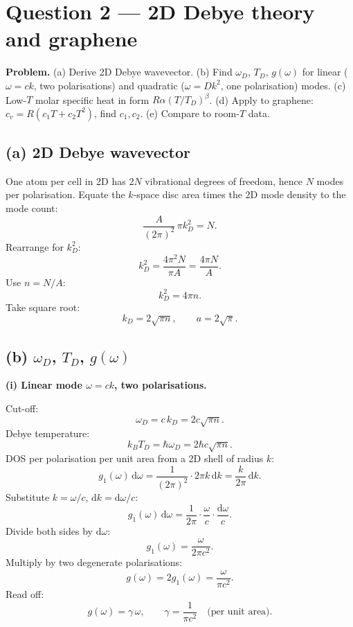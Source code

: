 \documentclass[11pt]{article}
\newcommand{\de}{\mathrm{d}}
\begin{document}
\section*{Question 2 --- 2D Debye theory and graphene}

\textbf{Problem.} (a) Derive 2D Debye wavevector. (b) Find $\omega_D$, $T_D$, $g(\omega)$ for linear ($\omega=ck$, two polarisations) and quadratic ($\omega=Dk^2$, one polarisation) modes. (c) Low-$T$ molar specific heat in form $R\alpha(T/T_D)^\beta$. (d) Apply to graphene: $c_v = R(c_1 T + c_2 T^2)$, find $c_1, c_2$. (e) Compare to room-$T$ data.

\subsection*{(a) 2D Debye wavevector}

One atom per cell in 2D has $2N$ vibrational degrees of freedom, hence $N$ modes per polarisation. Equate the $k$-space disc area times the 2D mode density to the mode count:
\[
\frac{A}{(2\pi)^2}\,\pi k_D^2 = N.
\]
Rearrange for $k_D^2$:
\[
k_D^2 = \frac{4\pi^2 N}{\pi A} = \frac{4\pi N}{A}.
\]
Use $n = N/A$:
\[
k_D^2 = 4\pi n.
\]
Take square root:
\begin{equation}
\boxed{\;k_D = 2\sqrt{\pi n},\qquad a = 2\sqrt{\pi}.\;}
\label{eq:kD2D}
\end{equation}

\subsection*{(b) $\omega_D$, $T_D$, $g(\omega)$}

\textbf{(i) Linear mode $\omega=ck$, two polarisations.}

Cut-off:
\[
\omega_D = c\,k_D = 2c\sqrt{\pi n}.
\]
Debye temperature:
\[
\boxed{\;k_B T_D = \hbar\omega_D = 2\hbar c\sqrt{\pi n}.\;}
\]
DOS per polarisation per unit area from a 2D shell of radius $k$:
\[
g_1(\omega)\,\de\omega = \frac{1}{(2\pi)^2}\cdot 2\pi k\,\de k = \frac{k}{2\pi}\,\de k.
\]
Substitute $k = \omega/c$, $\de k = \de\omega/c$:
\[
g_1(\omega)\,\de\omega = \frac{1}{2\pi}\cdot\frac{\omega}{c}\cdot\frac{\de\omega}{c}.
\]
Divide both sides by $\de\omega$:
\[
g_1(\omega) = \frac{\omega}{2\pi c^2}.
\]
Multiply by two degenerate polarisations:
\[
g(\omega) = 2 g_1(\omega) = \frac{\omega}{\pi c^2}.
\]
Read off:
\begin{equation}
\boxed{\;g(\omega) = \gamma\,\omega,\qquad \gamma = \frac{1}{\pi c^2}\quad\text{(per unit area)}.\;}
\label{eq:gw-linear}
\end{equation}
\end{document}
